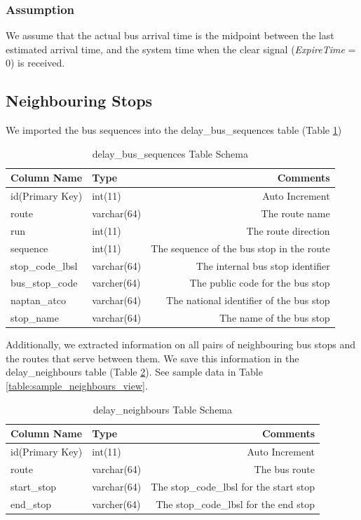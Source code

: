 \subsubsection{Assumption}
We assume that the actual bus arrival time is the midpoint between the last estimated arrival time, and the system time when the clear signal (\textit{ExpireTime} = 0) is received.

\subsection{Neighbouring Stops}
\label{sec:bus_stop_locations_routes}
We imported the bus sequences into the delay\_bus\_sequences table (Table \ref{table:delay_bus_sequences})

\begin{table}
\centering
\begin{tabular}{@{}llr@{}} \toprule
Column Name & Type & Comments\\ \midrule
id(Primary Key) & int(11)  & Auto Increment\\
route & varchar(64) &  The route name\\
run & int(11) & The route direction\\
sequence & int(11) & The sequence of the bus stop in the route\\
stop\_code\_lbsl & varchar(64) & The internal bus stop identifier\\
bus\_stop\_code & varcher(64) & The public code for the bus stop\\
naptan\_atco & varchar(64) & The national identifier of the bus stop\\
stop\_name & varchar(64) & The name of the bus stop\\ \bottomrule
\end{tabular}
\caption{delay\_bus\_sequences Table Schema}
\label{table:delay_bus_sequences}
\end{table}
\par Additionally, we extracted information on all pairs of neighbouring bus stops and the routes that serve between them. We save this information in the delay\_neighbours table (Table \ref{table:delay_neighbours}). See sample data in Table \ref{table:sample_neighbours_view}.

\begin{table}
\centering
\begin{tabular}{@{}llr@{}} \toprule
Column Name & Type & Comments\\ \midrule
id(Primary Key) & int(11)  & Auto Increment\\
route & varchar(64) & The bus route \\
start\_stop & varchar(64) & The stop\_code\_lbsl for the start stop\\
end\_stop & varcher(64) & The stop\_code\_lbsl for the end stop\\ \bottomrule
\end{tabular}
\caption{delay\_neighbours Table Schema}
\label{table:delay_neighbours}
\end{table}

